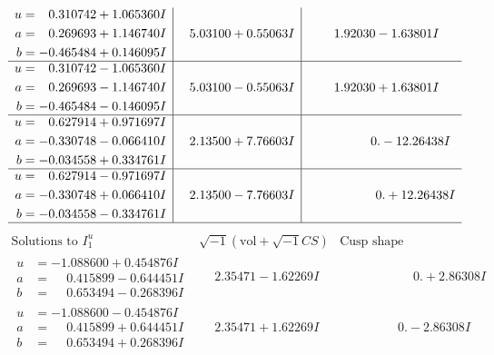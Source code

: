 \documentclass[1p]{elsarticle_modified}
\theoremstyle{definition}
\newcommand{\I}{\sqrt{-1}}
\begin{document}
$$\begin{array}{c|c|c}
\begin{aligned}
u &= \phantom{-}0.310742 + 1.065360 I \\
a &= \phantom{-}0.269693 + 1.146740 I \\
b &= -0.465484 + 0.146095 I\end{aligned}
 & \phantom{-}5.03100 + 0.55063 I & \phantom{-}1.92030 - 1.63801 I \\ \hline\begin{aligned}
u &= \phantom{-}0.310742 - 1.065360 I \\
a &= \phantom{-}0.269693 - 1.146740 I \\
b &= -0.465484 - 0.146095 I\end{aligned}
 & \phantom{-}5.03100 - 0.55063 I & \phantom{-}1.92030 + 1.63801 I \\ \hline\begin{aligned}
u &= \phantom{-}0.627914 + 0.971697 I \\
a &= -0.330748 - 0.066410 I \\
b &= -0.034558 + 0.334761 I\end{aligned}
 & \phantom{-}2.13500 + 7.76603 I & \phantom{-0.000000 } 0. - 12.26438 I \\ \hline\begin{aligned}
u &= \phantom{-}0.627914 - 0.971697 I \\
a &= -0.330748 + 0.066410 I \\
b &= -0.034558 - 0.334761 I\end{aligned}
 & \phantom{-}2.13500 - 7.76603 I & \phantom{-0.000000 -}0. + 12.26438 I\\
 \hline 
 \end{array}$$\newpage$$\begin{array}{c|c|c}  
\text{Solutions to }I^u_{1}& \I (\text{vol} + \sqrt{-1}CS) & \text{Cusp shape}\\
 \hline 
\begin{aligned}
u &= -1.088600 + 0.454876 I \\
a &= \phantom{-}0.415899 - 0.644451 I \\
b &= \phantom{-}0.653494 - 0.268396 I\end{aligned}
 & \phantom{-}2.35471 - 1.62269 I & \phantom{-0.000000 -}0. + 2.86308 I \\ \hline\begin{aligned}
u &= -1.088600 - 0.454876 I \\
a &= \phantom{-}0.415899 + 0.644451 I \\
b &= \phantom{-}0.653494 + 0.268396 I\end{aligned}
 & \phantom{-}2.35471 + 1.62269 I & \phantom{-0.000000 } 0. - 2.86308 I \\ \hline\begin{aligned}

\end{aligned}
\end{array}$$
\end{document}
